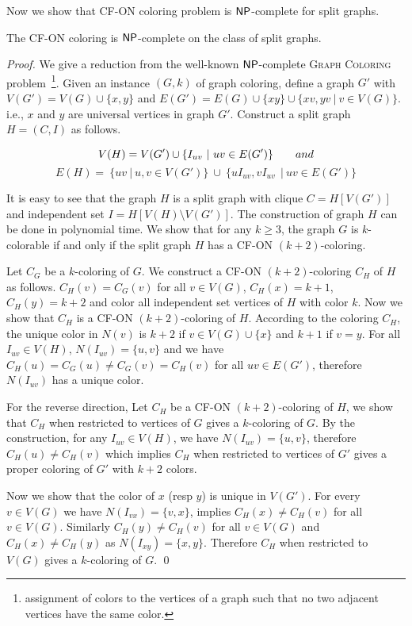 \documentclass[svgnames]{llncs}
\newcommand{\NP}{\ensuremath{\sf{NP}}\xspace}
\newcommand{\cfon}{\textsc {CF-ON}}
\begin{document}
Now we show that \cfon{} coloring problem is $\NP$-complete for split graphs. 
\begin{theorem}
The \cfon{} coloring is $\NP$-complete on the class of split graphs.
\end{theorem}

\begin{proof}
We give a reduction from the well-known $\NP$-complete \textsc{Graph Coloring} problem~\footnote{assignment of colors to the vertices of a graph such that no two adjacent vertices have the same color.}.
Given an instance  $(G,k)$ of graph coloring, define a graph $G'$ with $V(G')=V(G) \cup \{x,y\}$ and $E(G') = E(G) \cup  \{xy\} \cup \{xv, yv ~|~ v \in V(G)\}$.
i.e., $x$ and $y$ are universal vertices in graph $G'$.
Construct a split graph $H=(C,I)$ as follows.  

$$ V(H)= V(G') \cup \{I_{uv} ~|~ uv \in E(G')\} \text \qquad { and } $$ 
$$E(H)=  ~\{uv ~|~ u,v \in V(G')\} ~\cup ~\{uI_{uv},vI_{uv}\ ~|~ uv \in E(G') \}$$

It is easy to see that the graph $H$ is a split graph with clique $C=H[V(G')]$ and independent set $I=H[V(H) \setminus V(G')]$.
The construction of graph $H$ can be done in polynomial time. 
We show that for any $k \geq 3$, the graph $G$ is $k$-colorable if and only if the split graph $H$ has a \cfon{} $(k+2)$-coloring.

Let $C_G$ be a $k$-coloring of $G$.
We construct a \cfon{} $(k+2)$-coloring $C_H$ of $H$ as follows.
$C_H(v)=C_G(v)$ for all $v \in V(G)$, $C_H(x)=k+1$, $C_H(y)=k+2$ and color all independent set vertices of 
$H$ with color $k$.
Now we show that $C_H$ is a \cfon{} $(k+2)$-coloring of $H$.
According to the coloring $C_H$, the unique color in $N(v)$ is $k+2$ if $v \in V(G) \cup \{x\}$ and $k+1$ if $v=y$.   
For all $I_{uv} \in V(H)$, $N(I_{uv})=\{u,v\}$ and we have $C_H(u) =C_G(u)\neq C_G(v)=C_H(v)$ for all $uv \in E(G')$, therefore 
$N(I_{uv})$ has a unique color.


For the reverse direction, Let $C_H$ be a \cfon{} $(k+2)$-coloring of $H$, 
we show that $C_H$ when restricted to vertices of $G$ gives a $k$-coloring of $G$.  
By the construction, for any $I_{uv} \in V(H)$, we have $N( I_{uv}) = \{ u , v \}$,  therefore $C_H(u) \neq C_H(v)$ which implies
$C_H$ when restricted to vertices of $G'$ gives a proper coloring of $G'$ with $k+2$ colors.

Now we show that the color of $x$ (resp $y$) is unique in $V(G')$.
For every $v \in V(G)$ we have $N(I_{vx})=\{v,x\}$, implies $C_H(x) \neq C_H(v)$ for all $v \in V(G)$.
Similarly $C_H(y) \neq C_H(v)$ for all $v \in V(G)$ and $C_H(x) \neq C_H(y)$ as $N( I_{xy}) = \{ x , y \}$.
Therefore $C_H$ when restricted to $V(G)$ gives a $k$-coloring of $G$. \qed
\end{proof}
\end{document}

